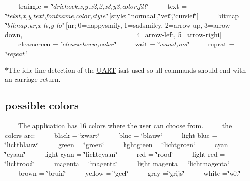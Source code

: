  ~~~~traingle = {\itshape \char`\"{}driehoek,x,y,x2,2,x3,y3,color,fill\char`\"{}}~\newline
 ~~~~text = {\itshape \char`\"{}tekst,x,y,text,fontname,color,style\char`\"{}} \mbox{[}style\+: \char`\"{}normaal\char`\"{},\char`\"{}vet\char`\"{},\char`\"{}cursief\char`\"{}\mbox{]}~\newline
 ~~~~bitmap = {\itshape \char`\"{}bitmap,nr,x-\/lo,y-\/lo\char`\"{}} \mbox{[}nr; 0=happysmily, 1=sadsmiley, 2=arrow-\/up, 3=arrow-\/down,~\newline
 ~~~~~~~~~~~~~~~~~~~~~~~~~~~~~~~~4=arrow-\/left, 5=arrow-\/right\mbox{]}~\newline
 ~~~~clearscreen = {\itshape \char`\"{}clearscherm,color\char`\"{}}~\newline
 ~~~~wait = {\itshape \char`\"{}wacht,ms\char`\"{}}~\newline
 ~~~~repeat = {\itshape \char`\"{}repeat\char`\"{}}~\newline


$\ast$\+The idle line detection of the \mbox{\hyperlink{namespace_u_a_r_t}{U\+A\+RT}} isn\textquotesingle{}t used so all commands should end with an carriage return.\hypertarget{index_colors}{}\subsection{possible colors}\label{index_colors}
~~~~The application has 16 colors where the user can choose from.~\newline
 ~~~~the colors are\+:~\newline
 ~~~~black = \char`\"{}zwart\char`\"{}~\newline
 ~~~~blue = \char`\"{}blauw\char`\"{}~\newline
 ~~~~light blue = \char`\"{}lichtblauw\char`\"{}~\newline
 ~~~~green = \char`\"{}groen\char`\"{}~\newline
 ~~~~lightgreen = \char`\"{}lichtgroen\char`\"{}~\newline
 ~~~~cyan = \char`\"{}cyaan\char`\"{}~\newline
 ~~~~light cyan = \char`\"{}lichtcyaan\char`\"{}~\newline
 ~~~~red = \char`\"{}rood\char`\"{}~\newline
 ~~~~light red = \char`\"{}lichtrood\char`\"{}~\newline
 ~~~~magenta = \char`\"{}magenta\char`\"{}~\newline
 ~~~~light magenta = \char`\"{}lichtmagenta\char`\"{}~\newline
 ~~~~brown = \char`\"{}bruin\char`\"{}~\newline
 ~~~~yellow = \char`\"{}geel\char`\"{}~\newline
 ~~~~gray =\char`\"{}grijs\char`\"{}~\newline
 ~~~~white =\char`\"{}wit\char`\"{}~\newline
 